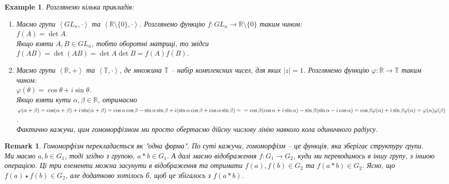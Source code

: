 \documentclass[a4paper, 10pt]{article}
\theoremstyle{theoremdd}
\theoremstyle{theoremdd}
\theoremstyle{theoremdd}
\theoremstyle{theoremdd}
\theoremstyle{theoremdd}
\newtheorem{example}[theorem]{Example}
\theoremstyle{theoremdd}
\theoremstyle{theoremdd}
\theoremstyle{theoremdd}
\theoremstyle{theoremdd}
\theoremstyle{theoremdd}
\theoremstyle{theoremdd}
\newtheorem{remark}[theorem]{Remark}
\theoremstyle{theoremdd}
\theoremstyle{theoremdd}
\theoremstyle{theoremdd}
\theoremstyle{theoremdd}
\begin{document}
\begin{example}
Розглянемо кілька прикладів:
\begin{enumerate}[nosep, wide=0pt,label={\arabic*{.}}]
\item Маємо групи $\left<GL_n,\cdot \right>$ та $\left<\mathbb{R} \setminus \{0\}, \cdot \right>$. Розглянемо функцію $f \colon GL_n \to \mathbb{R} \setminus \{0\}$ таким чином:\\
$f(A) = \det A$.\\
Якщо взяти $A,B \in GL_n$, тобто оборотні матриці, то звідси \\
$f(AB) = \det (AB) = \det A \det B = f(A) f(B)$.\\

\item Маємо групи $\left<\mathbb{R},+ \right>$ та $\left<\mathbb{T}, \cdot \right>$, де множина $\mathbb{T}$ -- набір комплексних чисел, для яких $|z| = 1$. Розглянемо функцію $\varphi \colon \mathbb{R} \to \mathbb{T}$ таким чином:\\
$\varphi(\theta) = \cos \theta + i \sin \theta$.\\
Якщо взяти кути $\alpha,\beta \in \mathbb{R}$, отримаємо \\
$\varphi(\alpha+\beta) = \cos (\alpha+\beta) + i \sin (\alpha + \beta) = \cos \alpha \cos \beta - \sin \alpha \sin \beta + i (\sin \alpha \cos \beta + \cos \alpha \sin \beta) = \\ = \cos \beta(\cos \alpha + i \sin \alpha) - \sin \beta (\sin \alpha -i\cos \alpha) = \cos \beta \varphi(\alpha) + i \sin \beta \varphi( \alpha) = \varphi(\alpha) \varphi(\beta)$.\\
Фактично кажучи, цим гомоморфізмом ми просто обертаємо дійсну числову лінію навколо кола одиничного радіусу.
\begin{figure}[H]
\centering
{}
\qquad
{}
\end{figure}
\end{enumerate}
\end{example}

\begin{remark}
Гомоморфізм перекладається як "одна форма". По суті кажучи, гомоморфізм -- це функція, яка зберігає структуру групи.\\
Ми маємо $a,b \in G_1$, тоді згідно з групою, $a*b \in G_1$. А далі маємо відображення $f \colon G_1 \to G_2$, куди ми переводимось в іншу групу, з іншою операцією. Ці три елементи можна засунути в відображення та отримати $f(a), f(b) \in G_2$ та $f(a*b) \in G_2$. Ясно, що $f(a) \star f(b) \in G_2$, але додатково хотілось б, щоб це збігалось з $f(a*b)$.
\end{remark}
\end{document}
